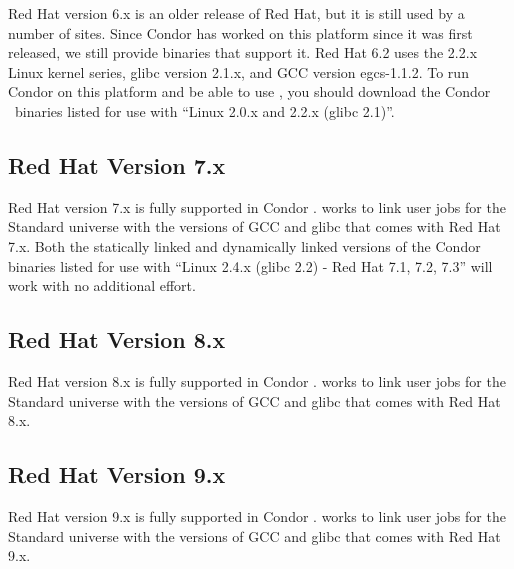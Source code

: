 Red Hat version 6.x is an older release of Red Hat, but it is still used
by a number of sites.
Since Condor has worked on this platform since it was first released,
we still provide binaries that support it.
Red Hat 6.2 uses the 2.2.x Linux kernel series, glibc version 2.1.x,
and GCC version egcs-1.1.2.
To run Condor on this platform and be able to use ,
you should download the Condor \VersionNotice\  binaries listed for use
with ``Linux 2.0.x and 2.2.x (glibc 2.1)''.


\subsection{\label{sec:platform-linux-rh7}Red Hat Version 7.x}

Red Hat version 7.x is fully supported in Condor \VersionNotice.
 works to link user jobs for the Standard universe
with the versions of GCC and glibc that comes with Red Hat 7.x.
Both the statically linked and dynamically linked versions of the
Condor binaries listed for use with ``Linux 2.4.x (glibc 2.2) - Red Hat
7.1, 7.2, 7.3'' will work with no additional effort.


\subsection{\label{sec:platform-linux-rh8}Red Hat Version 8.x}

Red Hat version 8.x is fully supported in Condor \VersionNotice.
 works to link user jobs for the Standard universe
with the versions of GCC and glibc that comes with Red Hat 8.x.

\subsection{\label{sec:platform-linux-rh9}Red Hat Version 9.x}

Red Hat version 9.x is fully supported in Condor \VersionNotice.
 works to link user jobs for the Standard universe
with the versions of GCC and glibc that comes with Red Hat 9.x.
